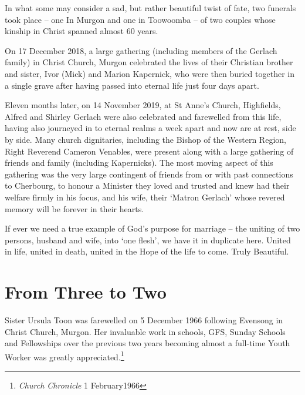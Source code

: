 In what some may consider a sad, but rather beautiful twist of fate, two funerals took place -- one In Murgon and one in Toowoomba -- of two couples whose kinship in Christ spanned almost 60 years.



On 17 December 2018, a large gathering (including members of the Gerlach family) in Christ Church, Murgon celebrated the lives of their Christian brother and sister, Ivor (Mick) and Marion Kapernick, who were then buried together in a single grave after having passed into eternal life just four days apart.



Eleven months later, on 14 November 2019, at St Anne's Church, Highfields, Alfred and Shirley Gerlach were also celebrated and farewelled from this life, having also journeyed in to eternal realms a week apart and now are at rest, side by side. Many church dignitaries, including the Bishop of the Western Region, Right Reverend Cameron Venables, were present along with a large gathering of friends and family (including Kapernicks). The most moving aspect of this gathering was the very large contingent of friends from or with past connections to Cherbourg, to honour a Minister they loved and trusted and knew had their welfare firmly in his focus, and his wife, their `Matron Gerlach' whose revered memory will be forever in their hearts.



If ever we need a true example of God's purpose for marriage -- the uniting of two persons, husband and wife, into `one flesh', we have it in duplicate here. United in life, united in death, united in the Hope of the life to come. Truly Beautiful.





\section{From Three to Two}



Sister Ursula Toon was farewelled on 5 December 1966 following Evensong in Christ Church, Murgon. Her invaluable work in schools, GFS, Sunday Schools and Fellowships over the previous two years becoming almost a full-time Youth Worker was greatly appreciated.\footnote{\emph{Church Chronicle} 1 February1966}


